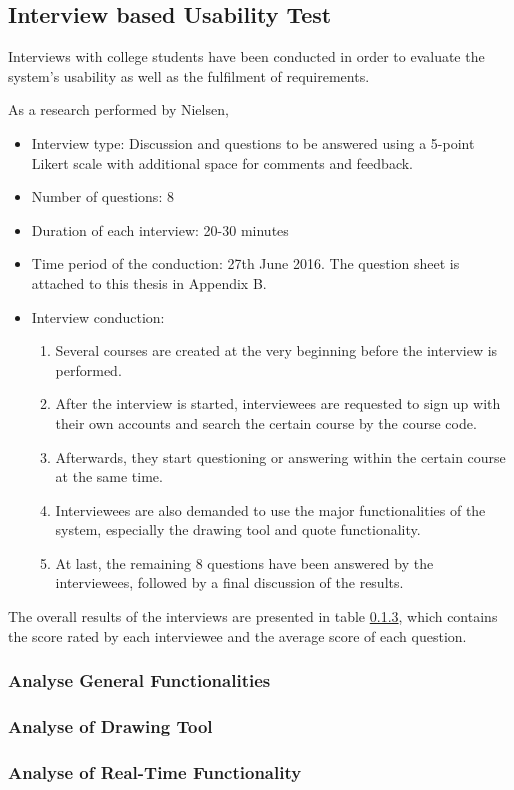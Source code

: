 


\subsection{Interview based Usability Test}

Interviews with college students have been conducted in order to evaluate the system's usability as well as the fulfilment of requirements. 

As a research performed by Nielsen, 

\begin{itemize}
  \item  Interview type: Discussion and questions to be answered using a 5-point Likert scale with additional space for comments and feedback.
  \item  Number of questions: 8
  \item  Duration of each interview: 20-30 minutes
  \item  Time period of the conduction: 27th June 2016. The question sheet is attached to this thesis in Appendix B.
  \item  Interview conduction: 
  \begin{enumerate}
    \item Several courses are created at the very beginning before the interview is performed. 
    \item After the interview is started, interviewees are requested to sign up with their own accounts and search the certain course by the course code.
    \item Afterwards, they start questioning or answering within the certain course at the same time.
    \item Interviewees are also demanded to use the major functionalities of the system, especially the drawing tool and quote functionality.
    \item At last, the remaining 8 questions have been answered by the interviewees, followed by a final discussion of the results.
  \end{enumerate}
\end{itemize}

The overall results of the interviews are presented in table \ref{}, which contains the score rated by each interviewee and the average score of each question. 

\subsubsection{Analyse General Functionalities}
\subsubsection{Analyse of Drawing Tool }
\subsubsection{Analyse of Real-Time Functionality}